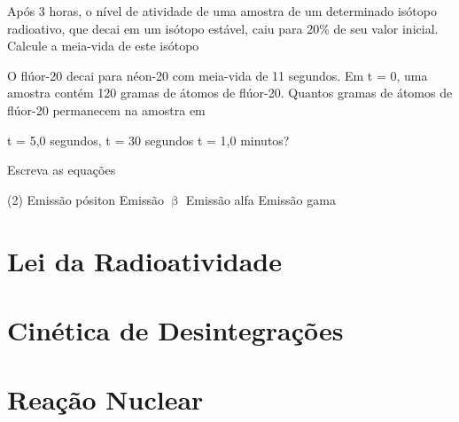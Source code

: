 \documentclass[10pt]{scrartcl}
\begin{document}
\begin{exercise}
Após 3 horas, o nível de atividade de uma amostra de um determinado isótopo radioativo, que decai em um isótopo estável, caiu para 20\% de seu valor inicial. Calcule a meia-vida de este isótopo
\vspace{2cm}
\end{exercise}


\begin{exercise}
O flúor-20 decai para néon-20 com meia-vida de 11 segundos. Em t = 0, uma amostra contém 120 gramas de átomos de flúor-20. Quantos gramas de átomos de flúor-20 permanecem na amostra em 

\begin{choice}
\choice  t = 5,0 segundos, 
\vspace{1.5cm}
\choice  t = 30 segundos 
\vspace{1.5cm}
\choice  t = 1,0 minutos?
\vspace{1.5cm}
\end{choice}
\end{exercise}









\begin{exercise}[points=3.5]
Escreva as equações

\begin{choice}(2)
\choice Emissão pósiton   \vspace{2cm}
\choice  Emissão \(\upbeta\)  \vspace{2cm}
\choice Emissão alfa	 \vspace{2cm}
\choice  Emissão gama \vspace{2cm}
\end{choice}
\end{exercise}



\section{Lei da Radioatividade}
\label{sec:orgf99036b}



\section{Cinética de Desintegrações}
\label{sec:org362ba66}




\section{Reação Nuclear}
\label{sec:org4bbaf73}


\end{document}
